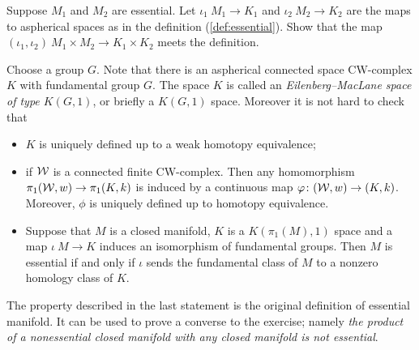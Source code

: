 Suppose $M_1$ and $M_2$ are essential.
Let $\iota_1\:M_1\to K_1$ and $\iota_2\:M_2\to K_2$ are the maps to aspherical spaces as in the definition (\ref{def:essential}).
Show that the map
$(\iota_1,\iota_2)\:M_1\times M_2\to K_1\times K_2$
meets the definition.

Choose a group $G$.
Note that there is an aspherical connected space CW-complex $K$ with fundamental group $G$.
The space $K$ is called an \emph{Eilenberg--MacLane space of type $K(G,1)$}, or briefly a $K(G,1)$ space.
Moreover it is not hard to check that
\begin{itemize}
\item $K$ is uniquely defined up to a weak homotopy equivalence;
\item if $\mathcal{W}$ is a connected finite CW-complex.
Then any homomorphism $\pi_1(\mathcal{W},w)\to\pi_1(K,k)$ is induced by a continuous map $\varphi\colon(\mathcal{W},w)\to(K,k)$.
Moreover, $\phi$ is uniquely defined up to homotopy equivalence.
\end{itemize}

\begin{itemize}
 \item Suppose that $M$ is a closed manifold, 
$K$ is a $K(\pi_1(M),1)$ space and a map $\iota\:M\to K$ induces an isomorphism of fundamental groups.
Then $M$ is essential if and only if $\iota$ sends the fundamental class of $M$ to a nonzero homology class of $K$.
\end{itemize}

The property described in the last statement is the original definition of essential manifold.
It can be used to prove a converse to the exercise;
namely \emph{the product of a nonessential closed manifold with any closed manifold is \emph{not} essential}.



